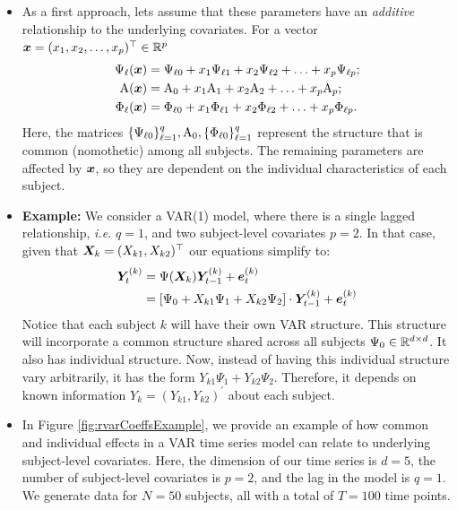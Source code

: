 \begin{itemize}
	\item As a first approach, lets assume that these parameters have an \textit{additive} relationship to the underlying covariates. For a vector $\bm{x}=(x_1,x_2,\ldots ,x_p)^\top\in\mathbb{R}^p$
	\begin{align*}
		\Psi_\ell(\bm{x}) &= \Psi_{\ell 0} + x_1 \Psi_{\ell 1} + x_2 \Psi_{\ell 2} + \ldots + x_p \Psi_{\ell p} ;\\
		\mathrm{A}(\bm{x}) &= \mathrm{A}_0 + x_1 \mathrm{A}_1 + x_2 \mathrm{A}_2 + \ldots + x_p \mathrm{A}_p ;\\
		\Phi_\ell(\bm{x}) &= \Phi_{\ell0} + x_1 \Phi_{\ell1} + x_2 \Phi_{\ell2} + \ldots + x_p \Phi_{\ell p}. \\
	\end{align*}
	Here, the matrices $\{\Psi_{\ell 0}\}_{\ell=1}^q, \mathrm{A}_0, \{\Phi_{\ell 0}\}_{\ell = 1}^q$ represent the structure that is common (nomothetic) among all subjects. The remaining parameters are affected by $\bm{x}$, so they are dependent on the individual characteristics of each subject.

	\item \textbf{Example:} We consider a VAR(1) model, where there is a single lagged relationship, \textit{i.e.} $q = 1$, and two subject-level covariates $p = 2$. In that case, given that $\bm{X}_k = (X_{k1},X_{k2})^\top$ our equations simplify to:
	\begin{align*}
		\bm{Y}^{(k)}_t &= \Psi(\bm{X}_k) \bm{Y}_{t-1}^{(k)} + \bm{e}^{(k)}_{t}\\
		&= [\Psi_{0} + X_{k1} \Psi_{1} + X_{k2} \Psi_{2}] \cdot \bm{Y}_{t-1}^{(k)} + \bm{e}^{(k)}_{t}
	\end{align*}
	Notice that each subject $k$ will have their own VAR structure. This structure will incorporate a common structure shared across all subjects $\Psi_0\in\mathbb{R}^{d\times d}$. It also has individual structure. Now, instead of having this individual structure vary arbitrarily, it has the form $Y_{k1} \Psi_{1} + Y_{k2} \Psi_{2}$. Therefore, it depends on known information $Y_k = (Y_{k1}, Y_{k2})^{'}$ about each subject.
	
	\item In Figure \ref{fig:rvarCoeffsExample}, we provide an example of how common and individual effects in a VAR time series model can relate to underlying subject-level covariates.	Here, the dimension of our time series is $ d = 5 $, the number of subject-level covariates is $ p = 2 $, and the lag in the model is $ q = 1 $. We generate data for $N = 50$ subjects, all with a total of $T = 100$ time points.



\end{itemize}
